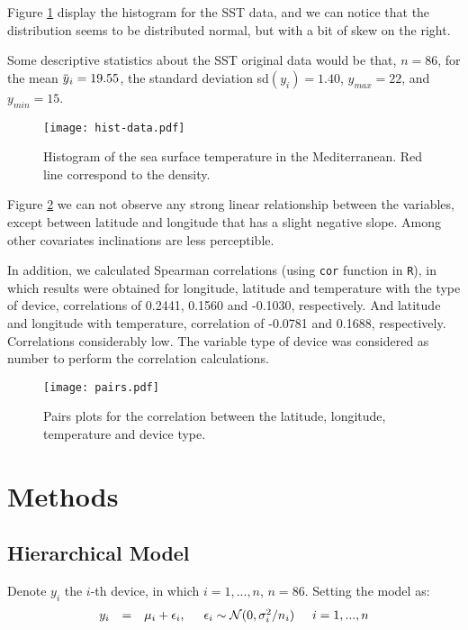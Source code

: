 \documentclass{asaproc}
\newcommand{\overbar}[1]{\mkern 1.5mu\overline{\mkern-1.5mu#1\mkern-1.5mu}\mkern 1.5mu}
\begin{document}
Figure \ref{Fig1} display the histogram for the SST data, and we can notice that the distribution seems to be distributed normal, but with a bit of skew on the right.

Some descriptive statistics about the SST original data would be that, $n=86$, for the mean $\overbar{y}_i = 19.55$, the standard deviation sd$(y_i) = 1.40$, $y_{max} = 22$, and $y_{min} = 15$.

\begin{figure}[H]
\centering
\texttt{[image: hist-data.pdf]}
\caption{Histogram of the sea surface temperature in the Mediterranean. Red line correspond to the density.}
\label{Fig1}
\end{figure}

Figure \ref{pairs} we can not observe any strong linear relationship between the variables, except between latitude and longitude that has a slight negative slope. Among other covariates inclinations are less perceptible.

In addition, we calculated Spearman correlations (using \texttt{cor} function in \texttt{R}), in which results were obtained for longitude, latitude and temperature with the type of device, correlations of 0.2441, 0.1560 and -0.1030, respectively. And latitude and longitude with temperature, correlation of -0.0781 and 0.1688, respectively. Correlations considerably low. The variable type of device was considered as number to perform the correlation calculations.
\begin{figure}[H]
\centering
\texttt{[image: pairs.pdf]}
\caption{Pairs plots for the correlation between the latitude, longitude, temperature and device type.}
\label{pairs}
\end{figure}


\section{Methods} \label{method}

\subsection{Hierarchical Model} 

Denote $y_{i}$ the $i$-th device, in which $i = 1, ..., n$, $n=86$. Setting the model as: 
\begin{eqnarray*}
\begin{array}{rcl }
y_i & = & \mu_i + \epsilon_i, \hspace{0.5cm} \epsilon_i \sim \mathcal{N}(0,\sigma_i^2/n_i)  \hspace{0.5cm} i = 1,...,n\\
\end{array}
\end{eqnarray*}
\end{document}
